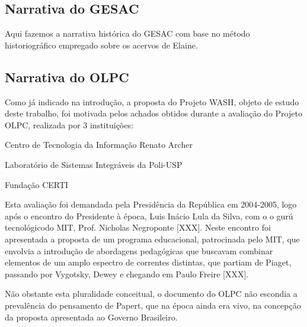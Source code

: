 \documentclass[
12pt,		%
openright,	%
twoside,  %
a4paper,			%
chapter=TITLE,		%
english,			%
french,				%
spanish,			%
brazil				%
]{USPSC-classe/USPSC_RedarTex}
\begin{document}
\subsection[Narrativa do GESAC]{Narrativa do GESAC}\label{Narrativa do GESAC}
Aqui fazemos a narrativa hist\'orica do GESAC com base no m\'etodo historiogr\'afico empregado sobre os acervos de Elaine.










\subsection[Narrativa do OLPC]{Narrativa do OLPC}\label{Narrativa do OLPC}
Como j\'a indicado na introdu\c{c}\~ao, a proposta do Projeto WASH, objeto de estudo deste trabalho, foi motivada pelos achados obtidos durante a avalia\c{c}\~ao do Projeto OLPC, realizada por 3 institui\c{c}\~oes:











\begin{alineas}
\item Centro de Tecnologia da Informa\c{c}\~ao Renato Archer
\item Laborat\'orio de Sistemas Integr\'aveis da Poli-USP
\item Funda\c{c}\~ao CERTI
\end{alineas}

Esta avalia\c{c}\~ao foi demandada pela Presid\^encia da Rep\'ublica em 2004-2005, logo ap\'os o encontro do Presidente \`a \'epoca, Luis In\'acio Lula da Silva, com o o \textquotedbl gur\'u tecnol\'ogico\textquotedbl  do MIT, Prof. Nicholas Negroponte [XXX]. Neste encontro foi apresentada a proposta de um programa educacional, patrocinada pelo MIT, que envolvia a introdu\c{c}\~ao de abordagens pedag\'ogicas que buscavam combinar elementos de um amplo espectro de correntes distintas, que partiam de Piaget, passando por Vygotsky, Dewey e chegando em Paulo Freire [XXX].










N\~ao obstante esta pluralidade conceitual, o documento do OLPC n\~ao escondia a preval\^encia do pensamento de Papert, que na \'epoca ainda era vivo, na concep\c{c}\~ao da proposta apresentada ao Governo Brasileiro.
\end{document}

